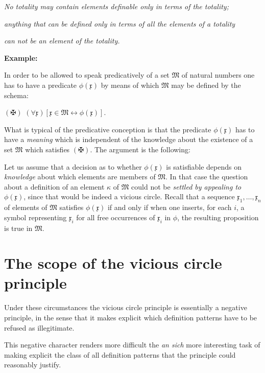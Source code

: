 \documentclass[12pt]{article}
\begin{document}
\begin{center}
\emph{No totality may contain elements definable  only in terms of the totality;} 

\emph{anything that can be defined only in terms of all the elements of a totality} 

\emph{can not be an element of the totality.}
\end{center}

\textbf{Example:}

In order to be allowed to speak predicatively of a set $\mathfrak{M}$ of natural numbers one has to have a predicate $\phi (\mathfrak{x})$ by means of which $\mathfrak{M}$ may be defined by the schema:

\begin{center}
$(\maltese)$ \qquad \qquad $(\forall \mathfrak{x}) [\mathfrak{x} \in \mathfrak{M} \leftrightarrow \phi (\mathfrak{x})].$
\end{center}

What is typical of the predicative conception is that the predicate $\phi (\mathfrak{x})$ has to have a \emph{meaning} which is independent of the knowledge about the existence of a set $\mathfrak{M}$ which satisfies $(\maltese)$. The argument is the following: 

Let us assume that a decision as to whether $\phi (\mathfrak{x})$ is satisfiable depends on \emph{knowledge} about which elements are members of $\mathfrak{M}$. In that case the question about a definition of an element $\kappa$ of $\mathfrak{M}$ could not be \emph{settled by appealing to} $\phi (\mathfrak{x})$, since that would be indeed a vicious circle. Recall that a sequence $\mathfrak{x}_1, \ldots, \mathfrak{x}_n$ of elements of $\mathfrak{M}$ satisfies $\phi (\mathfrak{x})$ if and only if when one inserts, for each $i$, a symbol representing $\mathfrak{x}_i$ for all free occurrences of $\mathfrak{x}_i$ in $\phi$, the resulting proposition is true in $\mathfrak{M}$.

\section{The scope of the vicious circle principle}\normalsize

Under these circumstances the vicious circle principle is essentially a negative principle, in the sense that it makes explicit which definition patterns have to be refused as illegitimate.

This negative character renders more difficult the \emph{an sich} more interesting task of making explicit the class of all definition patterns that the principle could reasonably justify.
\end{document}
